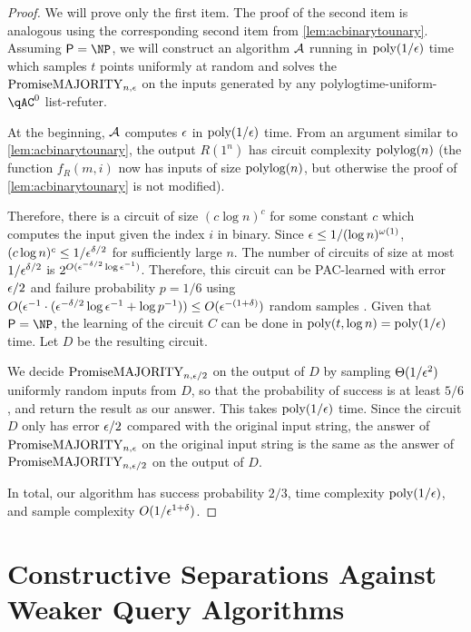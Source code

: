 \begin{proof}
    We will prove only the first item. The proof of the second item is analogous using the 
    corresponding second item from \cref{lem:acbinarytounary}.
    Assuming $\PTIME = \NP$, we will construct an algorithm $\mathcal{A}$ running in $\text{poly}(1/\epsilon)$ time
    which samples $t$ points uniformly at random and solves the $\mathrm{PromiseMAJORITY}_{n, \epsilon}$ on the
    inputs generated by any polylogtime-uniform-$\qAC^0$ list-refuter.

    At the beginning, $\mathcal{A}$ computes $\epsilon$ in $\text{poly}(1/\epsilon)$ time. 
    From an argument similar to \cref{lem:acbinarytounary}, the output
    $R(1^n)$ has circuit complexity $\text{polylog}(n)$ (the function $f_R(m, i)$ now has 
    inputs of size $\text{polylog}(n)$, but otherwise the proof of \cref{lem:acbinarytounary}
    is not modified).

    Therefore, there is a circuit of size $(c \log n)^c$ for some constant $c$ which computes
    the input given the index $i$ in binary. Since $\epsilon \leq 1/(\log n)^{\omega(1)}$,
    $(c \log n)^c \leq 1/\epsilon^{\delta/2}$ for sufficiently large $n$. 
    The number of circuits of size at most $1/\epsilon^{\delta/2}$ is $2^{O(\epsilon^{-\delta/2} \log \epsilon^{-1})}$.
    Therefore, this circuit can be PAC-learned with error $\epsilon/2$ and failure probability 
    $p = 1/6$ using $O(\epsilon^{-1} \cdot (\epsilon^{-\delta/2} \log \epsilon^{-1} + \log p^{-1})) \leq O(\epsilon^{-(1+\delta)})$
    random samples \cite[Theorem 2.5]{Mohri18}. Given that $\PTIME = \NP$, the learning of the circuit 
    $C$ can be done in $\text{poly}(t, \log n) = \text{poly}(1/\epsilon)$ time. Let $D$ be the resulting circuit.

    We decide $\mathrm{PromiseMAJORITY}_{n, \epsilon/2}$ on the output of $D$ by sampling $\Theta(1/\epsilon^2)$ uniformly random
    inputs from $D$, so that the probability of success is at least $5/6$, and return the result 
    as our answer. This takes $\text{poly}(1/\epsilon)$ time. 
    Since the circuit $D$ only has error $\epsilon/2$ 
    compared with the original input string, the answer of $\mathrm{PromiseMAJORITY}_{n, \epsilon}$ on the original input
    string is the same as the answer of $\mathrm{PromiseMAJORITY}_{n, \epsilon/2}$ on the output of $D$.
    
    In total, our algorithm has success probability $2/3$, time complexity $\text{poly}(1/\epsilon)$, and 
    sample complexity $O(1/\epsilon^{1+\delta})$. 
\end{proof}

\section{Constructive Separations Against Weaker Query Algorithms}
\label{sec:refuteragainstweakerqa}


